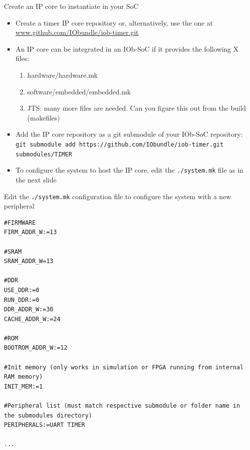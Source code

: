 \documentclass [xcolor=svgnames, t] {beamer}
\begin{document}
\begin{frame}{Create an IP core to instantiate in your SoC}
  \begin{itemize}
  \item Create a timer IP core repository or, alternatively, use the one at \url{www.github.com/IObundle/iob-timer.git}
  \item An IP core can be integrated in an IOb-SoC if it provides the following X files: 
    \begin{enumerate}
    \item hardware/hardware.mk
    \item software/embedded/embedded.mk
      \item JTS: many more files are needed. Can you figure this out from the build (makefiles)
    \end{enumerate}
  \item Add the IP core repository as a git submodule of your IOb-SoC repository:\\
    {\tiny \tt git submodule add https://github.com/IObundle/iob-timer.git submodules/TIMER}
  \item To configure the system to host the IP core, edit the {\tt ./system.mk} file as in the next slide
  \end{itemize}
\end{frame}

\lstset{basicstyle=\ttfamily,columns=fullflexible}

\begin{frame}[fragile]{Edit the {\tt ./system.mk} configuration file to configure the system with a new peripheral}
\begin{tiny}
\begin{lstlisting}
#FIRMWARE
FIRM_ADDR_W:=13

#SRAM
SRAM_ADDR_W=13

#DDR
USE_DDR:=0
RUN_DDR:=0
DDR_ADDR_W:=30
CACHE_ADDR_W:=24

#ROM
BOOTROM_ADDR_W:=12

#Init memory (only works in simulation or FPGA running from internal RAM memory)
INIT_MEM:=1

#Peripheral list (must match respective submodule or folder name in the submodules directory)
PERIPHERALS:=UART TIMER

...
\end{lstlisting}
\end{tiny}
\end{frame}
\end{document}
